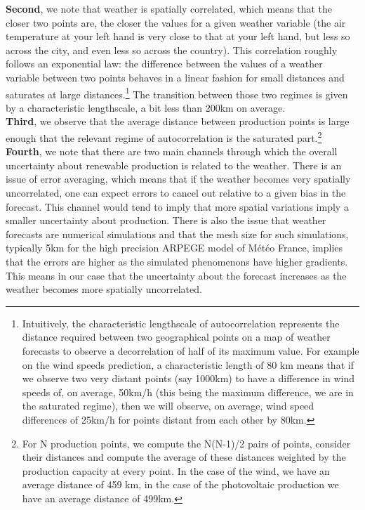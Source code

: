 \textbf{Second}, we note that weather is spatially correlated, which means that the closer two points are, the closer the values for a given weather variable (the air temperature at your left hand is very close to that at your left hand, but less so across the city, and even less so across the country). This correlation roughly follows an exponential law: the difference between the values of a weather variable between two points behaves in a linear fashion for small distances and saturates at large distances.\footnote{Intuitively, the characteristic lengthscale of autocorrelation represents the distance required between two geographical points on a map of weather forecasts to observe a decorrelation of half of its maximum value. For example on the wind speeds prediction, a characteristic length of 80 km means that if we observe two very distant points (say 1000km) to have a difference in wind speeds of, on average, 50km/h (this being the maximum difference, we are in the saturated regime), then we will observe, on average, wind speed differences of 25km/h for points distant from each other by 80km.} The transition between those two regimes is given by a characteristic lengthscale, a bit less than 200km on average. \\

\textbf{Third}, we observe that the average distance between production points is large enough that the relevant regime of autocorrelation is the saturated part.\footnote{For N production points, we compute the N(N-1)/2 pairs of points, consider their distances and compute the average of these distances weighted by the production capacity at every point. In the case of the wind, we have an average distance of 459 km, in the case of the photovoltaic production we have an average distance of 499km.} \\

\textbf{Fourth}, we note that there are two main channels through which the overall uncertainty about renewable production is related to the weather. There is an issue of error averaging, which means that if the weather becomes very spatially uncorrelated, one can expect errors to cancel out relative to a given bias in the forecast. This channel would tend to imply that more spatial variations imply a smaller uncertainty about production. There is also the issue that weather forecasts are numerical simulations and that the mesh size for such simulations, typically 5km for the high precision ARPEGE model of Météo France, implies that the errors are higher as the simulated phenomenons have higher gradients. This means in our case that the uncertainty about the forecast increases as the weather becomes more spatially uncorrelated. \\

